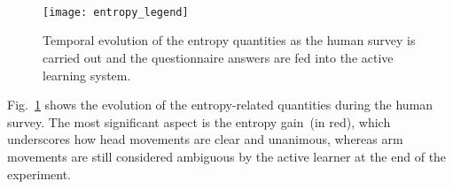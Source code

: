 \begin{figure}
\centering
%
 \quad
%
 \\
%
 \quad
%
 \\
%
 \quad
%
 \\
%
\subfloat
{\texttt{[image: entropy\_legend]}
\label{fig:entropy_by_people:legend} }
%
\caption[Temporal evolution of the entropy quantities as the human survey is carried out.]{Temporal evolution of the entropy quantities as the human survey is carried out and the questionnaire answers are fed into the active learning system.}
\label{fig:entropy_by_people}
\end{figure}

Fig.~\ref{fig:entropy_by_people} shows the evolution of the entropy-related quantities during the human survey. The most significant aspect is the entropy gain~(in red), which underscores how head movements are clear and unanimous, whereas arm movements are still considered ambiguous by the active learner at the end of the experiment.

